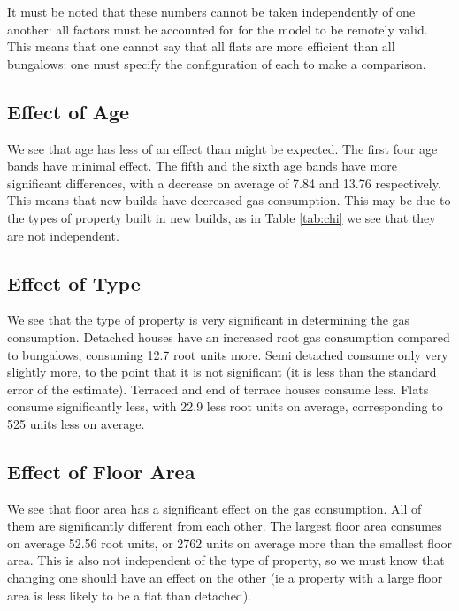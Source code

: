 \documentclass[]{extarticle}
\begin{document}
It must be noted that these numbers cannot be taken independently of one another: all factors must be accounted for for the model to be remotely valid. This means that one cannot say that all flats are more efficient than all bungalows: one must specify the configuration of each to make a comparison.

\subsection{Effect of Age}
We see that age has less of an effect than might be expected. The first four age bands have minimal effect. The fifth and the sixth age bands have more significant differences, with a decrease on average of 7.84 and 13.76 respectively. This means that new builds have decreased gas consumption. This may be due to the types of property built in new builds, as in Table \ref{tab:chi} we see that they are not independent.

\subsection{Effect of Type}
We see that the type of property is very significant in determining the gas consumption. Detached houses have an increased root gas consumption compared to bungalows, consuming 12.7 root units more. Semi detached consume only very slightly more, to the point that it is not significant (it is less than the standard error of the estimate). Terraced and end of terrace houses consume less. Flats consume significantly less, with 22.9 less root units on average, corresponding to 525 units less on average. 

\subsection{Effect of Floor Area}
We see that floor area has a significant effect on the gas consumption. All of them are significantly different from each other. The largest floor area consumes on average 52.56 root units, or 2762 units on average more than the smallest floor area. This is also not independent of the type of property, so we must know that changing one should have an effect on the other (ie a property with a large floor area is less likely to be a flat than detached).
\end{document}

